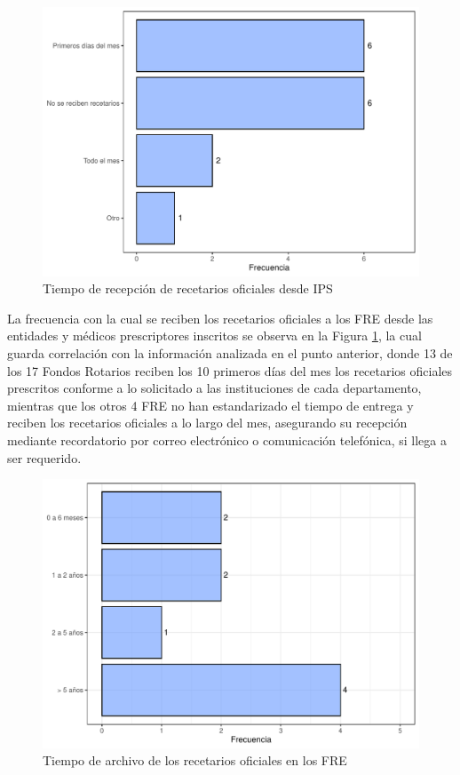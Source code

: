 \documentclass[
]{book}
\begin{document}
\begin{figure}
\includegraphics[width=0.85\linewidth]{InformeFinal_files/figure-latex/TiempoRecepcionRecOficiales-1} \caption{Tiempo de recepción de recetarios oficiales desde IPS}\label{fig:TiempoRecepcionRecOficiales}
\end{figure}

La frecuencia con la cual se reciben los recetarios oficiales a los FRE desde las entidades y médicos prescriptores inscritos se observa en la Figura \ref{fig:TiempoRecepcionRecOficiales}, la cual guarda correlación con la información analizada en el punto anterior, donde 13 de los 17 Fondos Rotarios reciben los 10 primeros días del mes los recetarios oficiales prescritos conforme a lo solicitado a las instituciones de cada departamento, mientras que los otros 4 FRE no han estandarizado el tiempo de entrega y reciben los recetarios oficiales a lo largo del mes, asegurando su recepción mediante recordatorio por correo electrónico o comunicación telefónica, si llega a ser requerido.

\begin{figure}
\includegraphics[width=0.85\linewidth]{InformeFinal_files/figure-latex/TiempoArchivoRecetariosOficiales-1} \caption{Tiempo de archivo de los recetarios oficiales en los FRE}\label{fig:TiempoArchivoRecetariosOficiales}
\end{figure}
\end{document}
